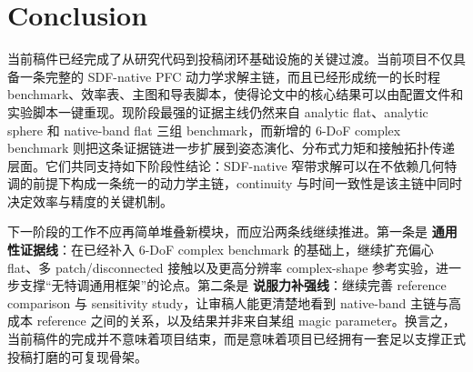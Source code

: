 \section{Conclusion}
当前稿件已经完成了从研究代码到投稿闭环基础设施的关键过渡。当前项目不仅具备一条完整的 SDF-native PFC 动力学求解主链，而且已经形成统一的长时程 benchmark、效率表、主图和导表脚本，使得论文中的核心结果可以由配置文件和实验脚本一键重现。现阶段最强的证据主线仍然来自 analytic flat、analytic sphere 和 native-band flat 三组 benchmark，而新增的 6-DoF complex benchmark 则把这条证据链进一步扩展到姿态演化、分布式力矩和接触拓扑传递层面。它们共同支持如下阶段性结论：SDF-native 窄带求解可以在不依赖几何特调的前提下构成一条统一的动力学主链，continuity 与时间一致性是该主链中同时决定效率与精度的关键机制。

下一阶段的工作不应再简单堆叠新模块，而应沿两条线继续推进。第一条是 \textbf{通用性证据线}：在已经补入 6-DoF complex benchmark 的基础上，继续扩充偏心 flat、多 patch/disconnected 接触以及更高分辨率 complex-shape 参考实验，进一步支撑“无特调通用框架”的论点。第二条是 \textbf{说服力补强线}：继续完善 reference comparison 与 sensitivity study，让审稿人能更清楚地看到 native-band 主链与高成本 reference 之间的关系，以及结果并非来自某组 magic parameter。换言之，当前稿件的完成并不意味着项目结束，而是意味着项目已经拥有一套足以支撑正式投稿打磨的可复现骨架。
